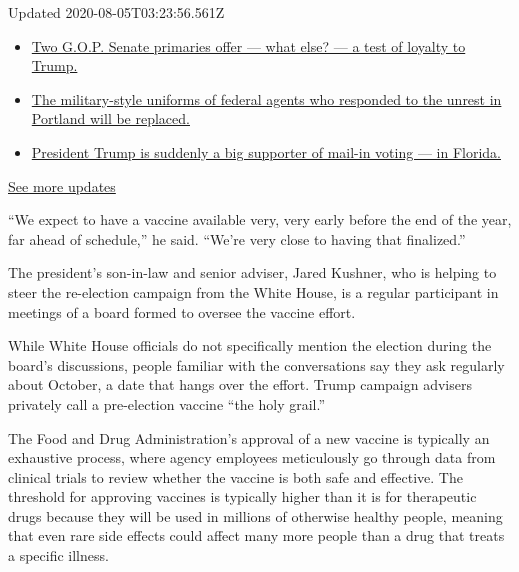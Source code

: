 Updated 2020-08-05T03:23:56.561Z

\begin{itemize}
\tightlist
\item
  \href{https://www.nytimes.com/2020/08/04/us/elections/primary-election-michigan-arizona-kansas.html?action=click\&pgtype=Article\&state=default\&region=MAIN_CONTENT_1\&context=storylines_live_updates\#link-3924dd44}{Two
  G.O.P. Senate primaries offer --- what else? --- a test of loyalty to
  Trump.}
\item
  \href{https://www.nytimes.com/2020/08/04/us/elections/primary-election-michigan-arizona-kansas.html?action=click\&pgtype=Article\&state=default\&region=MAIN_CONTENT_1\&context=storylines_live_updates\#link-62a8e06b}{The
  military-style uniforms of federal agents who responded to the unrest
  in Portland will be replaced.}
\item
  \href{https://www.nytimes.com/2020/08/04/us/elections/primary-election-michigan-arizona-kansas.html?action=click\&pgtype=Article\&state=default\&region=MAIN_CONTENT_1\&context=storylines_live_updates\#link-32b39e33}{President
  Trump is suddenly a big supporter of mail-in voting --- in Florida.}
\end{itemize}

\href{https://www.nytimes.com/2020/08/04/us/elections/primary-election-michigan-arizona-kansas.html?action=click\&pgtype=Article\&state=default\&region=MAIN_CONTENT_1\&context=storylines_live_updates}{See
more updates}

``We expect to have a vaccine available very, very early before the end
of the year, far ahead of schedule,'' he said. ``We're very close to
having that finalized.''

The president's son-in-law and senior adviser, Jared Kushner, who is
helping to steer the re-election campaign from the White House, is a
regular participant in meetings of a board formed to oversee the vaccine
effort.

While White House officials do not specifically mention the election
during the board's discussions, people familiar with the conversations
say they ask regularly about October, a date that hangs over the effort.
Trump campaign advisers privately call a pre-election vaccine ``the holy
grail.''

The Food and Drug Administration's approval of a new vaccine is
typically an exhaustive process, where agency employees meticulously go
through data from clinical trials to review whether the vaccine is both
safe and effective. The threshold for approving vaccines is typically
higher than it is for therapeutic drugs because they will be used in
millions of otherwise healthy people, meaning that even rare side
effects could affect many more people than a drug that treats a specific
illness.

